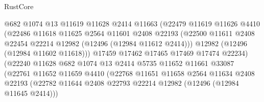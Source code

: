 \begin{lexlean}{RustCore}
\begin{coremodule}
                                @682
                                @1074
                                @13
                                @11619
                                @11628
                                @2414
                                @11663
                                (@22479
                                  @11619
                                  @11626
                                  @4410
                                  (@22486
                                    @11618
                                    @11625
                                    @2564
                                    @11601
                                    @2408
                                    @22193
                                    (@22500
                                      @11611
                                      @2408
                                      @22454
                                      @22214
                                      @12982
                                      (@12496 (@12984 @11612 @2414)))
                                    @12982
                                    (@12496 (@12984 @11602 @11618)))
                                  @17459
                                  @17462
                                  @17465
                                  @17469
                                  @17474
                                  @22234)
                                (@22240
                                  @11628
                                  @682
                                  @1074
                                  @13
                                  @2414
                                  @5735
                                  @11652
                                  @11661
                                  @33087
                                  (@22761
                                    @11652
                                    @11659
                                    @4410
                                    (@22768
                                      @11651
                                      @11658
                                      @2564
                                      @11634
                                      @2408
                                      @22193
                                      (@22782
                                        @11644
                                        @2408
                                        @22793
                                        @22214
                                        @12982
                                        (@12496 (@12984 @11645 @2414)))

\end{coremodule}
\end{lexlean}
